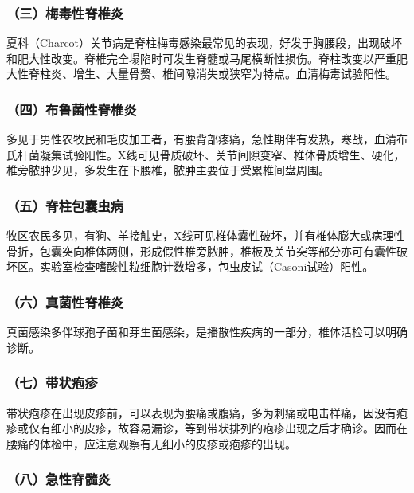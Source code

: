 \subsubsection{（三）梅毒性脊椎炎}

夏科（Charcot）关节病是脊柱梅毒感染最常见的表现，好发于胸腰段，出现破坏和肥大性改变。脊椎完全塌陷时可发生脊髓或马尾横断性损伤。脊柱改变以严重肥大性脊柱炎、增生、大量骨赘、椎间隙消失或狭窄为特点。血清梅毒试验阳性。

\subsubsection{（四）布鲁菌性脊椎炎}

多见于男性农牧民和毛皮加工者，有腰背部疼痛，急性期伴有发热，寒战，血清布氏杆菌凝集试验阳性。X线可见骨质破坏、关节间隙变窄、椎体骨质增生、硬化，椎旁脓肿少见，多发生在下腰椎，脓肿主要位于受累椎间盘周围。

\subsubsection{（五）脊柱包囊虫病}

牧区农民多见，有狗、羊接触史，X线可见椎体囊性破坏，并有椎体膨大或病理性骨折，包囊突向椎体两侧，形成假性椎旁脓肿，椎板及关节突等部分亦可有囊性破坏区。实验室检查嗜酸性粒细胞计数增多，包虫皮试（Casoni试验）阳性。

\subsubsection{（六）真菌性脊椎炎}

真菌感染多伴球孢子菌和芽生菌感染，是播散性疾病的一部分，椎体活检可以明确诊断。

\subsubsection{（七）带状疱疹}

带状疱疹在出现皮疹前，可以表现为腰痛或腹痛，多为刺痛或电击样痛，因没有疱疹或仅有细小的皮疹，故容易漏诊，等到带状排列的疱疹出现之后才确诊。因而在腰痛的体检中，应注意观察有无细小的皮疹或疱疹的出现。

\subsubsection{（八）急性脊髓炎}

